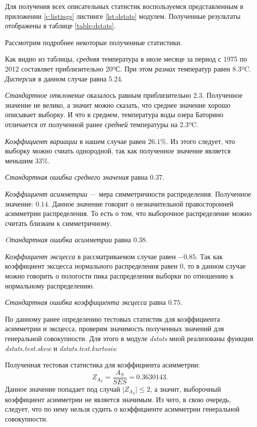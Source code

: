Для получения всех описательных статистик воспользуемся представленным в приложении \ref{c:listings} листинге \ref{lst:dstats} модулем. Полученные результаты отображены в таблице \ref{table:dstats}.



Рассмотрим подробнее некоторые полученные статистики.

Как видно из таблицы, \textit{средняя} температура в июле месяце за период с 1975 по 2012 составляет приблизительно 20ºС. При этом \textit{размах} температур равен 8.3ºC. \textit{Дисперсия} в данном случае равна 5.24.

\textit{Стандартное отклонение} оказалось равным приблизительно $2.3$. Полученное значение не велико, а значит можно сказать, что среднее значение хорошо описывает выборку. И что в среднем, температура воды озера Баторино отличается от полученной ранее \textit{средней} температуры на 2.3ºC.

\textit{Коэффициент вариации} в нашем случае равен $26.1\%$. Из этого следует, что выборку можно счиать однородной, так как полученное значение является меньшим 33\%.

\textit{Стандартная ошибка среднего значения} равна $0.37$.

\textit{Коэффициент асимметрии} --- мера симметричности распределения. Полученное значение: $0.14$. Данное значение говорит о незначительной правосторонней асимметрии распределения. То есть о том, что выборочное распределение можно считать близким к симметричному.

\textit{Cтандартная ошибка асимметрии} равна $0.38$.

\textit{Коэффициент эксцесса} в рассматриваемом случае равен $-0.85$. Так как коэффициент эксцесса нормального распределения равен $0$, то в данном случае можно говорить о пологости пика распределения выборки по отношению к нормальному распределению. 

\textit{Стандартная ошибка коэффициента эксцесса} равна $0.75$. 

По данному ранее определению тестовых статистик для коэффициента асимметрии и эксцесса, проверим значимость полученных значений для генеральной совокупности. Для этого в модуле \textit{dstats} мной реализованы функции \textit{dstats.test.skew} и \textit{dstats.test.kurtosis}:

Полученная тестовая статистика для коэффициента асимметрии:
\begin{equation*}
	Z_{A_S} = \frac{A_S}{SES} = 0.3630143.
\end{equation*}
Данное значение попадает под случай $\vert Z_{A_S} \vert \le 2$, а значит, выборочный коэффициент асимметрии не является значимым. Из чего, в свою очередь, следует, что по нему нельзя судить о коэффициенте асимметрии генеральной совокупности.

